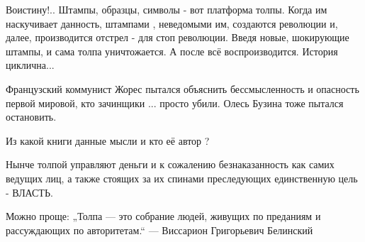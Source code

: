 \begin{itemize}
Воистину!.. Штампы, образцы, символы - вот платформа толпы. Когда им
наскучивает данность, штампами , неведомыми им, создаются революции и, далее,
производится отстрел - для стоп революции. Введя новые, шокирующие штампы, и
сама толпа уничтожается. А после всё воспроизводится. История циклична...


 

Французский коммунист Жорес пытался объяснить бессмысленность и опасность
первой мировой, кто зачинщики ... просто убили. Олесь Бузина тоже пытался
остановить.


 
Из какой книги данные мысли и кто её автор ?

 
Нынче толпой управляют деньги и к сожалению безнаказанность как самих ведущих лиц, а также стоящих за их спинами преследующих единственную цель - ВЛАСТЬ.

 


 
Можно проще: „Толпа — это собрание людей, живущих по преданиям и рассуждающих по авторитетам.“ — Виссарион Григорьевич Белинский

 


\end{itemize}
